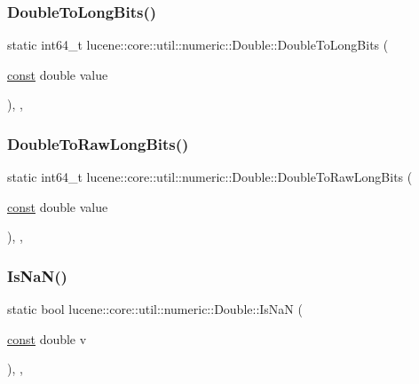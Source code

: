 \subsubsection{\texorpdfstring{Double\+To\+Long\+Bits()}{DoubleToLongBits()}}
{\footnotesize\ttfamily static int64\+\_\+t lucene\+::core\+::util\+::numeric\+::\+Double\+::\+Double\+To\+Long\+Bits (\begin{DoxyParamCaption}\item[{\mbox{\hyperlink{ZlibCrc32_8h_a2c212835823e3c54a8ab6d95c652660e}{const}} double}]{value }\end{DoxyParamCaption})\hspace{0.3cm}{\ttfamily [inline]}, {\ttfamily [static]}, {\ttfamily [noexcept]}}

\mbox{\label{classlucene_1_1core_1_1util_1_1numeric_1_1Double_a9063631b5b6ca044176db4f86a9f0e19}} 
\subsubsection{\texorpdfstring{Double\+To\+Raw\+Long\+Bits()}{DoubleToRawLongBits()}}
{\footnotesize\ttfamily static int64\+\_\+t lucene\+::core\+::util\+::numeric\+::\+Double\+::\+Double\+To\+Raw\+Long\+Bits (\begin{DoxyParamCaption}\item[{\mbox{\hyperlink{ZlibCrc32_8h_a2c212835823e3c54a8ab6d95c652660e}{const}} double}]{value }\end{DoxyParamCaption})\hspace{0.3cm}{\ttfamily [inline]}, {\ttfamily [static]}, {\ttfamily [noexcept]}}

\mbox{\label{classlucene_1_1core_1_1util_1_1numeric_1_1Double_a90f6bdede8ad6bb030246fc9f63c001d}} 
\subsubsection{\texorpdfstring{Is\+Na\+N()}{IsNaN()}}
{\footnotesize\ttfamily static bool lucene\+::core\+::util\+::numeric\+::\+Double\+::\+Is\+NaN (\begin{DoxyParamCaption}\item[{\mbox{\hyperlink{ZlibCrc32_8h_a2c212835823e3c54a8ab6d95c652660e}{const}} double}]{v }\end{DoxyParamCaption})\hspace{0.3cm}{\ttfamily [inline]}, {\ttfamily [static]}, {\ttfamily [noexcept]}}

